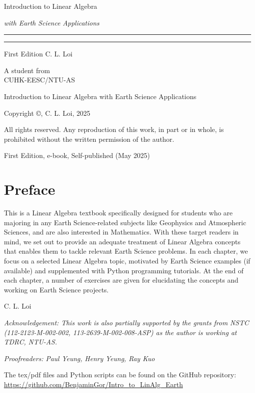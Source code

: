 \begin{titlepage}
    {\Huge\raggedright Introduction to Linear Algebra \par}
    {\Large\raggedright \textit{with Earth Science Applications} \hfill\textcolor{Mahogany}{\rule{3mm}{3mm}} \par}
    \vspace{3mm}\hrule\par
    {\Large\raggedleft First Edition \hfill C. L. Loi \par}
    \vfill
    {\Large\raggedleft A student from\\
    CUHK-EESC/NTU-AS \par}
\end{titlepage}

\begin{titlepage}
\begin{center}
Introduction to Linear Algebra with Earth Science Applications

Copyright ©, C. L. Loi, 2025

All rights reserved. Any reproduction of this work, in part or in whole, is prohibited without the written permission of the author.
\end{center}
\vfill
First Edition, e-book, Self-published (May 2025)
\end{titlepage}


\chapter*{Preface}
This is a Linear Algebra textbook specifically designed for students who are majoring in any Earth Science-related subjects like Geophysics and Atmospheric Sciences, and are also interested in Mathematics. With these target readers in mind, we set out to provide an adequate treatment of Linear Algebra concepts that enables them to tackle relevant Earth Science problems. In each chapter, we focus on a selected Linear Algebra topic, motivated by Earth Science examples (if available) and supplemented with Python programming tutorials. At the end of each chapter, a number of exercises are given for elucidating the concepts and working on Earth Science projects. \par
{\raggedleft C. L. Loi \par}
\textit{Acknowledgement: This work is also partially supported by the grants from NSTC (112-2123-M-002-002, 113-2639-M-002-008-ASP) as the author is working at TDRC, NTU-AS.}\par
\textit{Proofreaders: Paul Yeung, Henry Yeung, Ray Kuo}\par
The tex/pdf files and Python scripts can be found on the GitHub repository:\\ \href{https://github.com/BenjaminGor/Intro_to_LinAlg_Earth}{https://github.com/BenjaminGor/Intro\_to\_LinAlg\_Earth}

